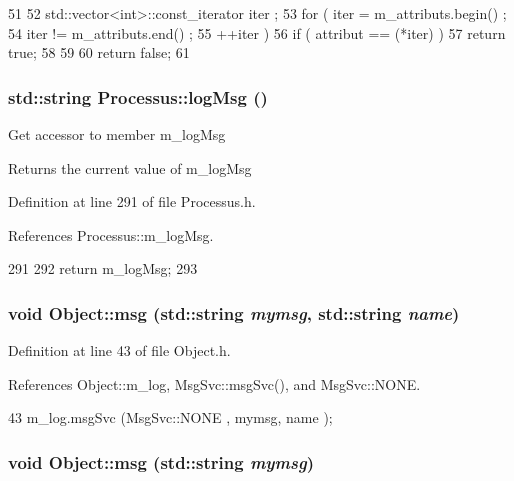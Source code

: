 \begin{DoxyCode}
51   {
52     std::vector<int>::const_iterator iter ;
53     for ( iter  = m_attributs.begin() ;
54           iter != m_attributs.end()   ;
55           ++iter ) {
56       if ( attribut == (*iter) ) {
57         return true;
58       }
59     }
60     return false;
61   }
\end{DoxyCode}
\hypertarget{classProcessus_a42fdeb17dc13ba854222666b6aa29b61}{
\subsubsection[{logMsg}]{\setlength{\rightskip}{0pt plus 5cm}std::string Processus::logMsg ()}}
\label{classProcessus_a42fdeb17dc13ba854222666b6aa29b61}
Get accessor to member m\_\-logMsg \begin{DoxyReturn}{Returns}
the current value of m\_\-logMsg 
\end{DoxyReturn}


Definition at line 291 of file Processus.h.

References Processus::m\_\-logMsg.


\begin{DoxyCode}
291                       {
292     return m_logMsg;
293   }
\end{DoxyCode}
\hypertarget{classObject_ac5d59299273cee27aacf7de00d2e7034}{
\subsubsection[{msg}]{\setlength{\rightskip}{0pt plus 5cm}void Object::msg (std::string {\em mymsg}, \/  std::string {\em name})}}
\label{classObject_ac5d59299273cee27aacf7de00d2e7034}


Definition at line 43 of file Object.h.

References Object::m\_\-log, MsgSvc::msgSvc(), and MsgSvc::NONE.


\begin{DoxyCode}
43 { m_log.msgSvc (MsgSvc::NONE    , mymsg, name ); }
\end{DoxyCode}
\hypertarget{classObject_a58b2d0618c2d08cf2383012611528d97}{
\subsubsection[{msg}]{\setlength{\rightskip}{0pt plus 5cm}void Object::msg (std::string {\em mymsg})}}
\label{classObject_a58b2d0618c2d08cf2383012611528d97}


